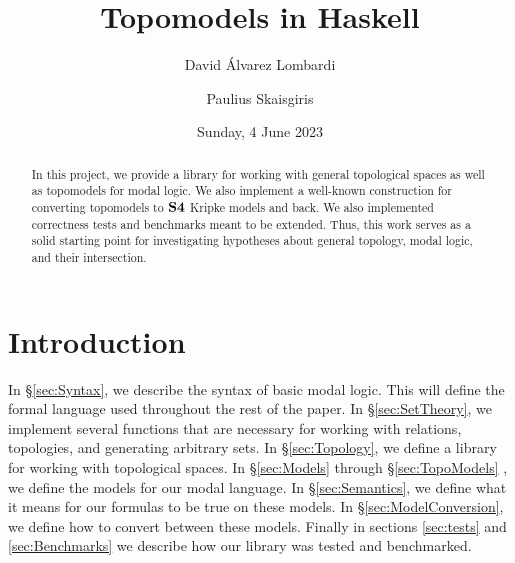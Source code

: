 \documentclass[12pt,a4paper]{article}
\title{Topomodels in Haskell}
\author{David Álvarez Lombardi \and Paulius Skaisgiris}
\date{Sunday, 4 June 2023}
\begin{document}
\maketitle

\begin{abstract}
In this project, we provide a library for working with general topological spaces as well as topomodels for modal logic.
We also implement a well-known construction for converting topomodels to $\mathbf{S4}$ Kripke models and back. We also implemented
correctness tests and benchmarks meant to be extended. Thus, this work serves as a solid starting point for investigating
hypotheses about general topology, modal logic, and their intersection.
\end{abstract}

\tableofcontents

\clearpage

\section{Introduction}

In \S \ref{sec:Syntax}, we describe the syntax of basic modal logic.
This will define the formal language used throughout the rest of the paper.
In \S \ref{sec:SetTheory}, we implement several functions that are necessary for working with relations, topologies, and generating arbitrary sets.
In \S \ref{sec:Topology}, we define a library for working with topological spaces.
In \S \ref{sec:Models} through \S \ref{sec:TopoModels} , we define the models for our modal language.
In \S \ref{sec:Semantics}, we define what it means for our formulas to be true on these models.
In \S \ref{sec:ModelConversion}, we define how to convert between these models.
Finally in sections \ref{sec:tests} and \ref{sec:Benchmarks} we describe how our library was tested and benchmarked.


















\end{document}
